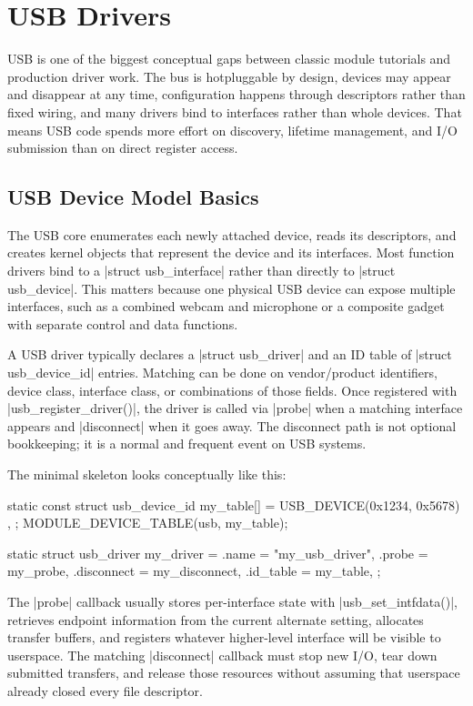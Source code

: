 \documentclass[10pt, oneside]{book}
\begin{document}
\section{USB Drivers}
\label{sec:usb}
USB is one of the biggest conceptual gaps between classic module tutorials and
production driver work.
The bus is hotpluggable by design, devices may appear and disappear at any
time, configuration happens through descriptors rather than fixed wiring, and
many drivers bind to interfaces rather than whole devices.
That means USB code spends more effort on discovery, lifetime management, and
I/O submission than on direct register access.

\subsection{USB Device Model Basics}
\label{sec:usb_basics}
The USB core enumerates each newly attached device, reads its descriptors, and
creates kernel objects that represent the device and its interfaces.
Most function drivers bind to a \cpp|struct usb_interface| rather than directly
to \cpp|struct usb_device|.
This matters because one physical USB device can expose multiple interfaces,
such as a combined webcam and microphone or a composite gadget with separate
control and data functions.

A USB driver typically declares a \cpp|struct usb_driver| and an ID table of
\cpp|struct usb_device_id| entries.
Matching can be done on vendor/product identifiers, device class, interface
class, or combinations of those fields.
Once registered with \cpp|usb_register_driver()|, the driver is called via
\cpp|probe| when a matching interface appears and \cpp|disconnect| when it goes
away.
The disconnect path is not optional bookkeeping; it is a normal and frequent
event on USB systems.

The minimal skeleton looks conceptually like this:
\begin{code}
static const struct usb_device_id my_table[] = {
    { USB_DEVICE(0x1234, 0x5678) },
    { }
};
MODULE_DEVICE_TABLE(usb, my_table);

static struct usb_driver my_driver = {
    .name = "my_usb_driver",
    .probe = my_probe,
    .disconnect = my_disconnect,
    .id_table = my_table,
};
\end{code}

The \cpp|probe| callback usually stores per-interface state with
\cpp|usb_set_intfdata()|, retrieves endpoint information from the current
alternate setting, allocates transfer buffers, and registers whatever
higher-level interface will be visible to userspace.
The matching \cpp|disconnect| callback must stop new I/O, tear down submitted
transfers, and release those resources without assuming that userspace already
closed every file descriptor.
\end{document}
